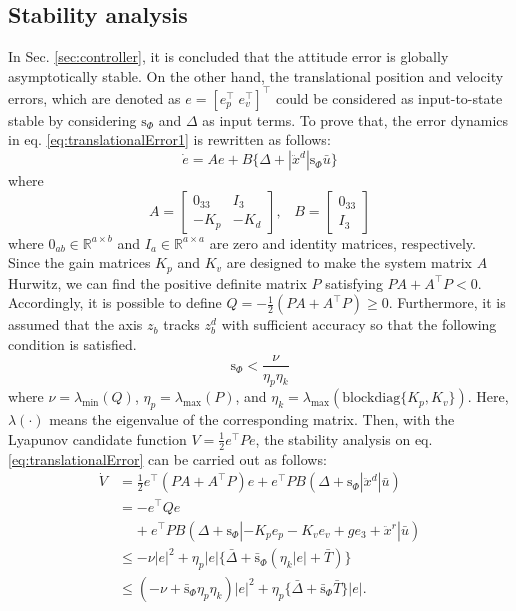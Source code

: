 \documentclass[letterpaper, 10 pt, conference]{ieeeconf}  %
\begin{document}
\subsection{Stability analysis}
In Sec. \ref{sec:controller}, it is concluded that the attitude error is globally asymptotically stable.
On the other hand, the translational position and velocity errors, which are denoted as $e = [e_p^\intercal\;e_v^\intercal]^\intercal$ could be considered as input-to-state stable by considering $\text{s}_\Phi$ and $\Delta$ as input terms. To prove that, the error dynamics in eq. \eqref{eq:translationalError1} is rewritten as follows: 
\begin{equation}
\dot{e} = Ae
 + B\{\Delta+|\ddot{x}^d|\text{s}_\Phi\bar{u}\} \label{eq:translationalError} 
\end{equation}
where
\begin{equation}
A = \left[
\begin{array}{rr}
0_{33} & I_3 \\ -K_p & -K_d 
\end{array}
\right],\;\;\;B = \left[
\begin{array}{r}
0_{33} \\ I_3
\end{array}
\right] 
\end{equation}
where $0_{ab} \in \mathbb{R}^{a\times b}$ and $I_a\in\mathbb{R}^{a\times a}$ are zero and identity matrices, respectively.
Since the gain matrices $K_p$ and $K_v$ are designed to make the system matrix $A$ Hurwitz, we can find the positive definite matrix $P$ satisfying $PA + A^\intercal P < 0$. Accordingly, it is possible to define $Q = -\frac{1}{2}(PA +A^\intercal P) \geq 0$. 
Furthermore, it is assumed that the axis $z_b$ tracks $z_b^d$ with sufficient accuracy so that the following condition is satisfied.
\begin{equation}
\text{s}_\Phi < {\frac{\nu}{\eta_p\eta_k}} \label{eq:angleCondition}
\end{equation}
where 
$\nu = \lambda_{\min}(Q)$, $\eta_p = \lambda_{\max}(P)$, and $\eta_k = \lambda_{\max}(\text{blockdiag}\{K_p,K_v\})$.
Here, $\lambda(\cdot)$ means the eigenvalue of the corresponding matrix.
Then, with the Lyapunov candidate function $V = \frac{1}{2}e^\intercal P e$, the stability analysis on eq. \eqref{eq:translationalError} can be carried out as follows: 
\begin{align}
\dot{V} &= \textstyle{\frac{1}{2}}e^\intercal (PA + A^\intercal P)e + e^\intercal P B (\Delta + \text{s}_\Phi|\ddot{x}^d|\bar{u}) \nonumber \\
&= -e^\intercal Q e \label{eq:lyapForFunnel} \\
&\;\;\;\; + e^\intercal P B (\Delta + \text{s}_\Phi |-K_p e_p - K_v e_v +ge_3+{\ddot{x}}^r|\bar{u}) \nonumber  \\
&\leq -\nu |e|^2 + \eta_p|e|\{\bar{\Delta}+\bar{\text{s}}_\Phi(\eta_k|e|+\bar{T})\} \nonumber \\
&\leq (-\nu + \bar{\text{s}}_\Phi\eta_p\eta_k)|e|^2 + \eta_p\{\bar{\Delta} + \bar{\text{s}}_\Phi\bar{T}\}|e|. \label{eq:lyapForISS} 
\end{align}
\end{document}
